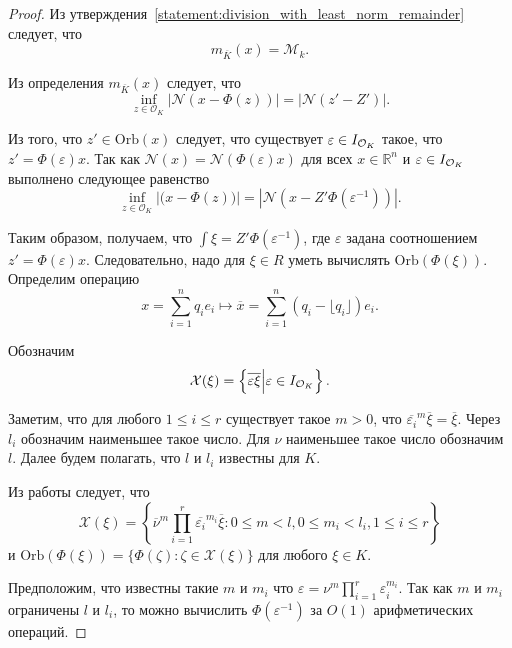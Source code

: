 \documentclass[_00_dissertation.tex]{subfiles}
\begin{document}
\begin{proof}
    Из утверждения~\ref{statement:division_with_least_norm_remainder} следует, что
    \begin{equation*}
        m_{\overline{K}}(x) = \mathcal{M}_k.
    \end{equation*}
    
    Из определения $m_{\overline{K}}(x)$ следует, что
    \begin{equation*}
        \inf\limits_{z \in \mathcal{O}_K} |\mathcal{N}(x - \Phi(z))| = |\mathcal{N}(z' - Z')|.
    \end{equation*}

    Из того, что $z' \in \textrm{Orb}(x)$ следует, что существует $\varepsilon \in I_{\mathcal{O}_K}$ такое, что $z' = \Phi(\varepsilon)x$.
    Так как $\mathcal{N}(x) = \mathcal{N}(\Phi(\varepsilon)x)$ для всех $x \in \mathbb{R}^n$ и $\varepsilon \in I_{\mathcal{O}_K}$ выполнено следующее равенство
    \begin{equation*}
        \inf\limits_{z \in \mathcal{O}_K} |\mathcal(x - \Phi(z))| = |\mathcal{N}(x - Z'\Phi(\varepsilon^{-1}))|.
    \end{equation*}

    Таким образом, получаем, что $\int{\xi} = Z'\Phi(\varepsilon^{-1})$, где $\varepsilon$ задана соотношением $z' = \Phi(\varepsilon)x$.
    Следовательно, надо для $\xi \in R$ уметь вычислять $\textrm{Orb}(\Phi(\xi))$.
    Определим операцию
    \begin{equation*}
        x = \sum\limits_{i=1}^n q_i e_i \longmapsto \overline{x} = \sum\limits_{i=1}^n (q_i - \lfloor q_i \rfloor)e_i.
    \end{equation*}
    
    Обозначим
    \begin{equation*}
        \mathcal{X}(\xi) = \left\{
            \overline{\varepsilon\xi} \Big| \varepsilon \in I_{\mathcal{O}_K}
    	\right\}.
    \end{equation*}
    
    Заметим, что для любого $1 \le i \le r$ существует такое $m > 0$, что $\overline{\varepsilon_i}^m\overline{\xi} = \overline{\xi}$.
    Через $l_i$ обозначим наименьшее такое число.
    Для $\nu$ наименьшее такое число обозначим $l$.
    Далее будем полагать, что $l$ и $l_i$ известны для $K$.
    
    Из работы \cite[с.~1413]{source:Lezowski} следует, что
    \begin{equation*}
        \mathcal{X}(\xi) = \left\{
            \overline{\nu}^m \prod\limits_{i=1}^r \overline{\varepsilon_i}^{m_i} \overline{\xi}:
                0 \le m < l, 0 \le m_i < l_i, 1 \le i \le r
        \right\}
    \end{equation*}
    и $\textrm{Orb}(\Phi(\xi)) = \{\Phi(\zeta):\zeta \in \mathcal{X}(\xi)\}$ для любого $\xi\in K$.

    Предположим, что известны такие $m$ и $m_i$ что $\varepsilon = \nu^m\prod_{i=1}^r \varepsilon_i^{m_i}$.
    Так как $m$ и $m_i$ ограничены $l$ и $l_i$, то можно вычислить $\Phi(\varepsilon^{-1})$ за $O(1)$ арифметических операций.
\end{proof}
\end{document}
